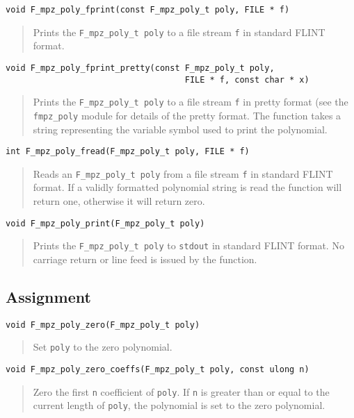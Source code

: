 \documentclass[a4paper,10pt]{article}
\newcommand{\code}{\lstinline}
\begin{document}
\begin{lstlisting}
void F_mpz_poly_fprint(const F_mpz_poly_t poly, FILE * f)
\end{lstlisting}
\begin{quote}
Prints the \code{F_mpz_poly_t poly} to a file stream \code{f} in standard FLINT format.
\end{quote}

\begin{lstlisting}
void F_mpz_poly_fprint_pretty(const F_mpz_poly_t poly, 
                                    FILE * f, const char * x)
\end{lstlisting}
\begin{quote}
Prints the \code{F_mpz_poly_t poly} to a file stream \code{f} in pretty format (see the 
\code{fmpz_poly} module for details of the pretty format. The function takes a string representing 
the variable symbol used to print the polynomial.
\end{quote}

\begin{lstlisting}
int F_mpz_poly_fread(F_mpz_poly_t poly, FILE * f)
\end{lstlisting}
\begin{quote}
Reads an \code{F_mpz_poly_t poly} from a file stream \code{f} in standard FLINT format. If a validly
formatted polynomial string is read the function will return one, otherwise it will return zero.
\end{quote}

\begin{lstlisting}
void F_mpz_poly_print(F_mpz_poly_t poly)
\end{lstlisting}
\begin{quote}
Prints the \code{F_mpz_poly_t poly} to \code{stdout} in standard FLINT format. No carriage return
or line feed is issued by the function.
\end{quote}

\subsection{Assignment}

\begin{lstlisting}
void F_mpz_poly_zero(F_mpz_poly_t poly)
\end{lstlisting}
\begin{quote}
Set \code{poly} to the zero polynomial.
\end{quote}

\begin{lstlisting}
void F_mpz_poly_zero_coeffs(F_mpz_poly_t poly, const ulong n)
\end{lstlisting}
\begin{quote}
Zero the first \code{n} coefficient of \code{poly}. If \code{n} is greater than or equal to the 
current length of \code{poly}, the polynomial is set to the zero polynomial.
\end{quote}
\end{document}
